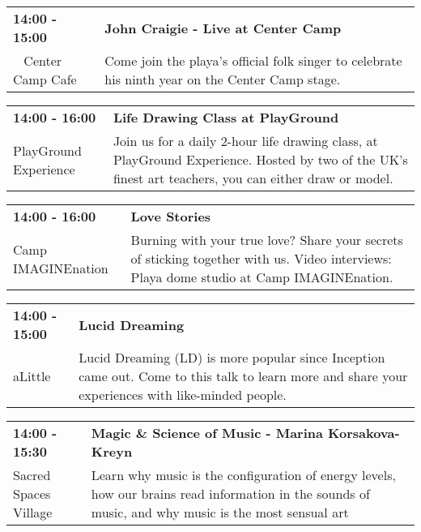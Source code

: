 \begin{tabular}{ p{1in} p{2.2in} }
    \textbf{14:00 - 15:00} & \textbf{John Craigie - Live at Center Camp} \\
    ~ \newline Center Camp Cafe & Come join the playa's official folk singer to celebrate his ninth year on the Center Camp stage. \\
    \hline 
\end{tabular}
    
\begin{tabular}{ p{1in} p{2.2in} }
    \textbf{14:00 - 16:00} & \textbf{Life Drawing Class at PlayGround} \\
    PlayGround Experience \newline  & Join us for a daily 2-hour life drawing class, at PlayGround Experience. Hosted by two of the UK's finest art teachers, you can either draw or model. \\
    \hline 
\end{tabular}
    
\begin{tabular}{ p{1in} p{2.2in} }
    \textbf{14:00 - 16:00} & \textbf{Love Stories} \\
    Camp IMAGINEnation \newline  & Burning with your true love? Share your secrets of sticking together with us. Video interviews: Playa dome studio at Camp IMAGINEnation. \\
    \hline 
\end{tabular}
    
\begin{tabular}{ p{1in} p{2.2in} }
    \textbf{14:00 - 15:00} & \textbf{Lucid Dreaming} \\
    aLittle \newline  & Lucid Dreaming (LD) is more popular since Inception came out. Come to this talk to learn more and share your experiences with like-minded people. \\
    \hline 
\end{tabular}
    
\begin{tabular}{ p{1in} p{2.2in} }
    \textbf{14:00 - 15:30} & \textbf{Magic \& Science of Music - Marina Korsakova-Kreyn} \\
    Sacred Spaces Village \newline  & Learn why music is the configuration of energy levels, how our brains read information in the sounds of music, and why music is the most sensual art \\
    \hline 
\end{tabular}
    
